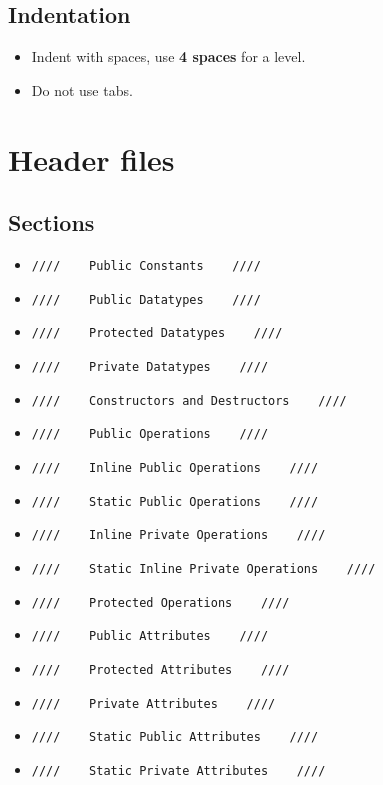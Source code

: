 \documentclass[a4paper,twoside,15pt]{book}
\begin{document}
            \subsection{Indentation}
                \begin{itemize}
                    \item Indent with spaces, use \textbf{4 spaces} for a level.
                    \item Do not use tabs.
                \end{itemize}

    \section{Header files}
        \subsection{Sections}
            \begin{itemize}
                \item {\color{highlight_c_comment}\verb'////    Public Constants    ////'}
                \item {\color{highlight_c_comment}\verb'////    Public Datatypes    ////'}
                \item {\color{highlight_c_comment}\verb'////    Protected Datatypes    ////'}
                \item {\color{highlight_c_comment}\verb'////    Private Datatypes    ////'}
                \item {\color{highlight_c_comment}\verb'////    Constructors and Destructors    ////'}
                \item {\color{highlight_c_comment}\verb'////    Public Operations    ////'}
                \item {\color{highlight_c_comment}\verb'////    Inline Public Operations    ////'}
                \item {\color{highlight_c_comment}\verb'////    Static Public Operations    ////'}
                \item {\color{highlight_c_comment}\verb'////    Inline Private Operations    ////'}
                \item {\color{highlight_c_comment}\verb'////    Static Inline Private Operations    ////'}
                \item {\color{highlight_c_comment}\verb'////    Protected Operations    ////'}
                \item {\color{highlight_c_comment}\verb'////    Public Attributes    ////'}
                \item {\color{highlight_c_comment}\verb'////    Protected Attributes    ////'}
                \item {\color{highlight_c_comment}\verb'////    Private Attributes    ////'}
                \item {\color{highlight_c_comment}\verb'////    Static Public Attributes    ////'}
                \item {\color{highlight_c_comment}\verb'////    Static Private Attributes    ////'}
            \end{itemize}
\end{document}
